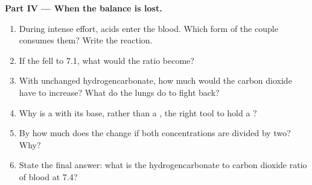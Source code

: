 \begin{problem}
\medskip
\noindent\textbf{Part IV --- When the balance is lost.}
\begin{enumerate}[resume]
  \item During intense effort, acids enter the blood. Which form of the
        couple consumes them? Write the reaction.
  \item If the  fell to 7.1, what would the ratio become?
  \item With unchanged hydrogencarbonate, how much would the carbon
        dioxide have to increase? What do the lungs do to fight back?
  \item Why is a  with its base, rather than a , the
        right tool to hold a ?
  \item By how much does the  change if both concentrations are divided
        by two? Why?
  \item State the final answer: what is the hydrogencarbonate to carbon
        dioxide ratio of blood at  7.4?
\end{enumerate}
\end{problem}
